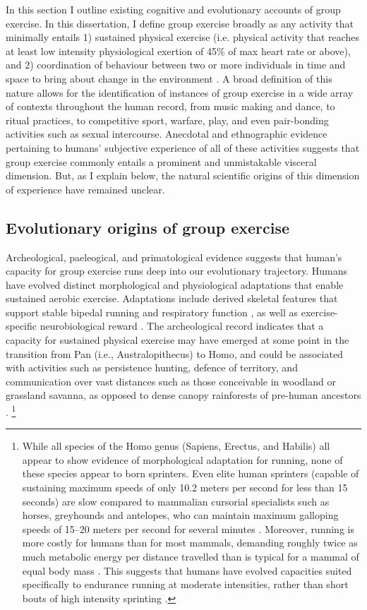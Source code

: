 \begin{CJK}{UTF8}{gbsn}
In this section I outline existing cognitive and evolutionary accounts of group exercise.  In this dissertation, I define group exercise broadly as any activity that minimally entails 1) sustained physical exercise (i.e. physical activity that reaches at least low intensity physiological exertion of 45\% of max heart rate or above), and 2) coordination of behaviour between two or more individuals in time and space to bring about change in the environment \citep[a.k.a., joint action, see][]{Sebanz2006,Vesper2010}.  A broad definition of this nature allows for the identification of instances of group exercise in a wide array of contexts throughout the human record, from music making and dance, to ritual practices, to competitive sport, warfare, play, and even pair-bonding activities such as sexual intercourse.  Anecdotal and ethnographic evidence pertaining to humans' subjective experience of all of these activities suggests that group exercise commonly entails a prominent and unmistakable visceral dimension. But, as I explain below, the natural scientific origins of this dimension of experience have remained unclear.


\subsection{Evolutionary origins of group exercise}
Archeological, paeleogical, and primatological evidence suggests that human’s capacity for group exercise runs deep into our evolutionary trajectory.  Humans have evolved distinct morphological and physiological adaptations that enable sustained aerobic exercise.  Adaptations include derived skeletal features that support stable bipedal running and respiratory function \citep[see ][]{Bramble2004}, as well as exercise-specific neurobiological reward \citep{Raichlen2012}.  The archeological record indicates that a capacity for sustained physical exercise may have emerged at some point in the transition from Pan (i.e., Australopithecus) to Homo, and could be associated with activities such as persistence hunting, defence of territory, and communication over vast distances such as those conceivable in woodland or grassland savanna, as opposed to dense canopy rainforests of pre-human ancestors \citep{Sands2012}.
    \footnote{While all species of the Homo genus (Sapiens, Erectus, and Habilis) all appear to show evidence of morphological adaptation for running, none of these species appear to born sprinters.  Even elite human sprinters (capable of sustaining maximum speeds of only 10.2 meters per second for less than 15 seconds) are slow compared to mammalian cursorial specialists such as horses, greyhounds and antelopes, who can maintain maximum galloping speeds of 15–20 meters per second for several minutes \citep{Garland1983}.  Moreover, running is more costly for humans than for most mammals, demanding roughly twice as much metabolic energy per distance travelled than is typical for a mammal of equal body mass \citep{Taylor1982}.  This suggests that humans have evolved capacities suited specifically to endurance running at moderate intensities, rather than short bouts of high intensity sprinting \citep{Bramble2004}.}


\end{CJK}
